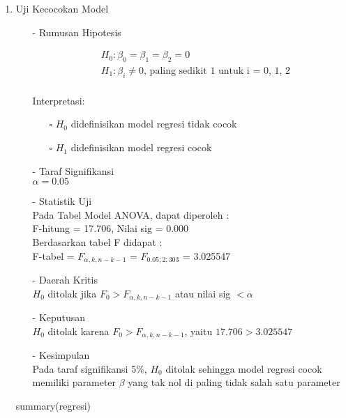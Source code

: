 \begin{enumerate}
\item Uji Kecocokan Model \\
\begin{test}{
    \begin{enumerate}
    \item[-] Rumusan Hipotesis \\
    \begin{fleqn}[\parindent]
        \begin{equation*}
        \begin{split}
        &H_0 : \beta_0 = \beta_1 = \beta_2 = 0 \\ 
        &H_1 : \beta_i \neq 0 \text{, paling sedikit 1 untuk i = 0, 1, 2} \\
        \end{split}
        \end{equation*}
    \end{fleqn}
    Interpretasi:
    \begin{enumerate}
    \item[$\square$] $H_0$ didefinisikan model regresi tidak cocok
    \item[$\square$] $H_1$ didefinisikan model regresi cocok
    \end{enumerate}

    \item[-] Taraf Signifikansi \\
    $\alpha = 0.05$

    \item[-] Statistik Uji \\
    Pada Tabel Model ANOVA, dapat diperoleh : \\
    F-hitung = 17.706, Nilai sig = 0.000 \\
    Berdasarkan tabel F didapat : \\
    F-tabel = $F_{\alpha, k, n-k-1}$ = $F_{0.05; 2; 303}$ = 3.025547

    \item[-] Daerah Kritis \\
    $H_0$ ditolak jika $F_0 > F_{\alpha, k, n-k-1}$ atau nilai sig $< \alpha$

    \item[-] Keputusan \\
    $H_0$ ditolak karena $F_0 > F_{\alpha, k, n-k-1}$, yaitu $17.706 > 3.025547$

    \item[-] Kesimpulan \\
    Pada taraf signifikansi 5\%, $H_0$ ditolak sehingga model regresi cocok memiliki parameter $\beta$ yang tak nol di paling tidak salah satu parameter
\end{enumerate}
}
summary(regresi)
\end{test}


\end{enumerate}
